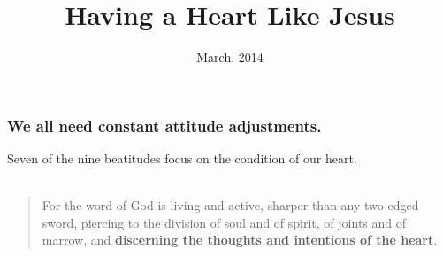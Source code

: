 \documentclass{beamer}
\title{Having a Heart Like Jesus}
\date{March, 2014}
\begin{document}
\frame{\titlepage}


\begin{frame}
\frametitle{We all need constant attitude adjustments.}
Seven of the nine beatitudes focus on the condition of our heart.\\~\\
\begin{quote}
For the word of God is living and active, sharper than any two-edged sword, piercing to the division of soul and of spirit, of joints and of marrow, and \textbf{discerning the thoughts and intentions of the heart}.

\end{quote}


\end{frame}
\end{document}
